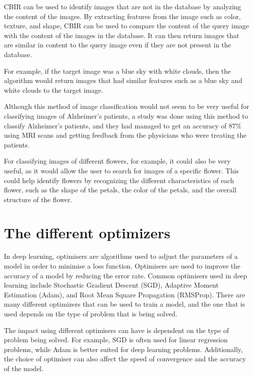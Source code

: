 \documentclass[]{final_report}
\begin{document}
CBIR can be used to identify images that are not in the database by analyzing the content of the images.
By extracting features from the image such as color, texture, and shape, CBIR can be used to compare the
content of the query image with the content of the images in the database. It can then return images that are
similar in content to the query image even if they are not present in the database.

For example, if the target image was a blue sky with white clouds, then the algorithm would return
images that had similar features such as a blue sky and white clouds to the target image.

Although this method of image classification would not seem to be very useful for classifying images of Alzheimer's patients,
a study was done using this method to classify Alzheimer's patients, and they had managed to get an accuracy of 87\% using MRI scans\cite{5972513}
and getting feedback from the physicians who were treating the patients.

For classifying images of different flowers, for example, it could also be very useful, as it would allow the user to search for images of a specific flower.
This could help identify flowers by recognizing the different characteristics of each flower, such as the shape of the petals,
the color of the petals, and the overall structure of the flower.

\section{The different optimizers}

In deep learning, optimisers are algorithms used to adjust the parameters of a model in order to minimise a loss function.
Optimisers are used to improve the accuracy of a model by reducing the error rate.
Common optimisers used in deep learning include Stochastic Gradient Descent (SGD),
Adaptive Moment Estimation (Adam), and Root Mean Square Propagation (RMSProp).
There are many different optimizers that can be used to train a model, and the one
that is used depends on the type of problem that is being solved.

The impact using different optimisers can have is dependent on the type of problem being solved.
For example, SGD is often used for linear regression problems, while Adam is
better suited for deep learning problems.
Additionally, the choice of optimiser can also affect the speed of convergence and the accuracy of the model.
\end{document}
